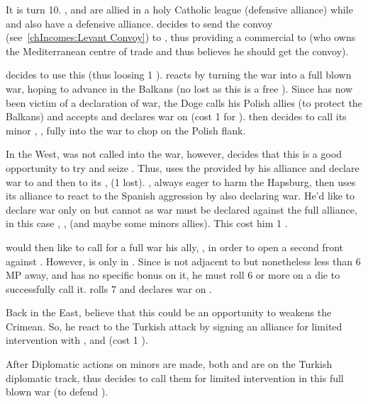 \begin{exemple}
  It is turn 10. \HIS, \VEN and \POL are allied in a holy Catholic league
  (defensive alliance) while \TUR and \FRA also have a defensive
  alliance. \TUR decides to send the  convoy
  (see~\ref{chIncomes:Levant Convoy}) to \FRA, thus providing a commercial \CB
  to \VEN (who owns the Mediterranean centre of trade and thus believes he
  should get the convoy).

  \VEN decides to use this \CB (thus loosing 1 \STAB). \TUR reacts by turning
  the war into a full blown war, hoping to advance in the Balkans (no \STAB
  lost as this is a free \CB). Since \VEN has now been victim of a declaration
  of war, the Doge calls his Polish allies (to protect the Balkans) and \POL
  accepts and declares war on \TUR (cost 1 \STAB for \POL). \TUR then decides
  to call its minor \VASSAL, \paysCrimee, fully into the war to chop on the
  Polish flank.

  In the West, \HIS was not called into the war, however, 
  decides that this is a good opportunity to try and seize
  \provinceTunis. Thus, \HIS uses the \CB provided by his alliance and declare
  war to \TUR and then to its \VASSAL, \paysTunisie (1 \STAB
  lost). , always eager to harm the Hapsburg, then uses
  its alliance to react to the Spanish aggression by also declaring war. He'd
  like to declare war only on \HIS but cannot as war must be declared against
  the full alliance, in this case \VEN, \HIS, \POL (and maybe some minors
  allies). This cost him 1 \STAB.

  \HIS would then like to call for a full war his ally, \paysPalatinat, in
  order to open a second front against \FRA. However, \paysPalatinat is only
  in \EW. Since \paysPalatinat is not adjacent to \FRA but nonetheless less
  than 6 MP away, and \HIS has no specific bonus on it, he must roll 6 or more
  on a die to successfully call it. \HIS rolls 7 and \paysPalatinat declares
  war on \FRA.

  Back in the East, \RUS believe that this could be an opportunity to weakens
  the Crimean. So, he react to the Turkish attack by signing an alliance for
  limited intervention with \HIS, \VEN and \POL (cost 1 \STAB).

  After Diplomatic actions on minors are made, both \paysKazan and
  \paysAstrakhan are on the Turkish diplomatic track, thus \TUR decides to
  call them for limited intervention in this full blown war (to defend
  \paysCrimee).


\end{exemple}

